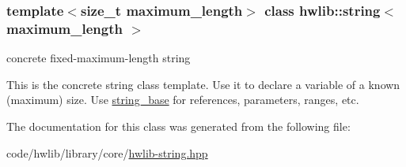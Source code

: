 \subsubsection*{template$<$size\+\_\+t maximum\+\_\+length$>$\newline
class hwlib\+::string$<$ maximum\+\_\+length $>$}

concrete fixed-\/maximum-\/length string

This is the concrete string class template. Use it to declare a variable of a known (maximum) size. Use \hyperlink{classhwlib_1_1string__base}{string\+\_\+base} for references, parameters, ranges, etc. 

The documentation for this class was generated from the following file\+:\begin{DoxyCompactItemize}
\item 
code/hwlib/library/core/\hyperlink{hwlib-string_8hpp}{hwlib-\/string.\+hpp}\end{DoxyCompactItemize}
